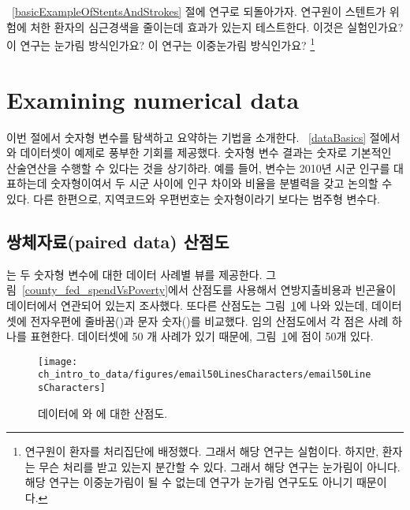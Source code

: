 \begin{exercise}
~\ref{basicExampleOfStentsAndStrokes} 절에 연구로 되돌아가자. 연구원이 스텐트가 위험에 처한 환자의 심근경색을 줄이는데 효과가 있는지 테스트한다. 이것은 실험인가요? 이 연구는 눈가림 방식인가요?  이 연구는 이중눈가림 방식인가요?
\footnote{연구원이 환자를 처리집단에 배정했다. 그래서 해당 연구는 실험이다.
하지만, 환자는 무슨 처리를 받고 있는지 분간할 수 있다. 그래서 해당 연구는 눈가림이 아니다. 해당 연구는 이중눈가림이 될 수 없는데 연구가 눈가림 연구도도 아니기 때문이다.}
\end{exercise}


\section[숫자형 데이터 살펴보기]{Examining numerical data }
\label{numericalData}

이번 절에서 숫자형 변수를 탐색하고 요약하는 기법을 소개한다.
~\ref{dataBasics} 절에서 와  데이터셋이 예제로 풍부한 기회를 제공했다.
숫자형 변수 결과는 숫자로 기본적인 산술연산을 수행할 수 있다는 것을 상기하라.
예를 들어,  변수는 2010년 시군 인구를 대표하는데 숫자형이여서
두 시군 사이에 인구 차이와 비율을 분별력을 갖고 논의할 수 있다.
다른 한편으로, 지역코드와 우편번호는 숫자형이라기 보다는 범주형 변수다.


\subsection{쌍체자료(paired data) 산점도}
\label{scatterPlots}


는 두 숫자형 변수에 대한 데이터 사례별 뷰를 제공한다.
그림~\vref{county_fed_spendVsPoverty}에서 산점도를 사용해서 연방지출비용과 빈곤율이  데이터에서 연관되어 있는지 조사했다. 또다른 산점도는 그림~\ref{email50LinesCharacters}에 나와 있는데,  데이터셋에 전자우편에 줄바꿈()과 문자 숫자()를 비교했다.
임의 산점도에서 각 점은 사례 하나를 표현한다.  데이터셋에 50 개 사례가 있기 때문에, 
그림~\ref{email50LinesCharacters}에 점이 50개 있다.

\textC{\setlength{\captionwidth}{0.9\textwidth}}

\begin{figure}[h]
   \centering
   \texttt{[image: ch\_intro\_to\_data/figures/email50LinesCharacters/email50LinesCharacters]}
   \caption{ 데이터에  와 에 대한 산점도.}
   \label{email50LinesCharacters}
\end{figure}

